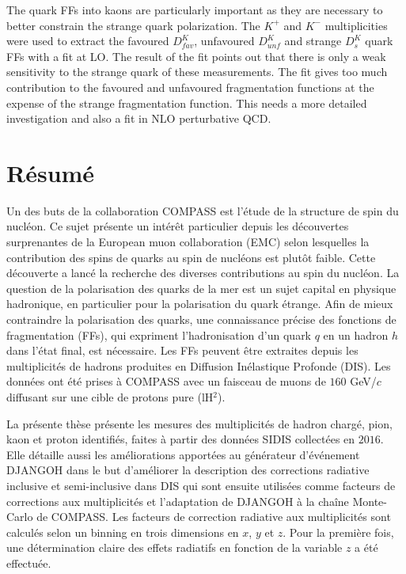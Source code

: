 The quark FFs into kaons are particularly important as they are necessary to better constrain the strange quark polarization. The $K^+$ and $K^-$ multiplicities were used to extract the favoured $D^{K}_{fav}$, unfavoured $D^{K}_{unf}$ and strange $D^{K}_{s}$ quark FFs with a fit at LO. The result of the fit points out that there is only a weak sensitivity to the strange quark of these measurements. The fit gives too much contribution to the favoured and unfavoured fragmentation functions at the expense of the strange fragmentation function. This needs a more detailed investigation and also a fit in NLO perturbative QCD.

\newpage

\chapter*{Résumé}

Un des buts de la collaboration COMPASS est l'étude de la structure de spin du nucléon. Ce sujet présente un intérêt particulier depuis les découvertes surprenantes de la European muon collaboration (EMC) selon lesquelles la contribution des spins de quarks au spin de nucléons est plutôt faible. Cette découverte a lancé la recherche des diverses contributions au spin du nucléon. La question de la polarisation des quarks de la mer est un sujet capital en physique hadronique, en particulier pour la polarisation du quark étrange.
Afin de mieux contraindre la polarisation des quarks, une connaissance précise des fonctions de fragmentation (FFs), qui expriment l'hadronisation d'un quark $q$ en un hadron $h$ dans l'état final, est nécessaire. Les FFs peuvent être extraites depuis les multiplicités de hadrons produites en Diffusion Inélastique Profonde (DIS). Les données ont été prises à COMPASS avec un faisceau de muons de $160$ GeV/$c$ diffusant sur une cible de protons pure (lH$^2$).

La présente thèse présente les mesures des multiplicités de hadron chargé, pion, kaon et proton identifiés, faites à partir des données SIDIS collectées en $2016$. Elle détaille aussi les améliorations apportées au générateur d'événement DJANGOH dans le but d'améliorer la description des corrections radiative inclusive et semi-inclusive dans DIS qui sont ensuite utilisées comme facteurs de corrections aux multiplicités et l'adaptation de DJANGOH à la chaîne Monte-Carlo de COMPASS. Les facteurs de correction radiative aux multiplicités sont calculés selon un binning en trois dimensions en $x$, $y$ et $z$. Pour la première fois, une détermination claire des effets radiatifs en fonction de la variable $z$ a été effectuée.

